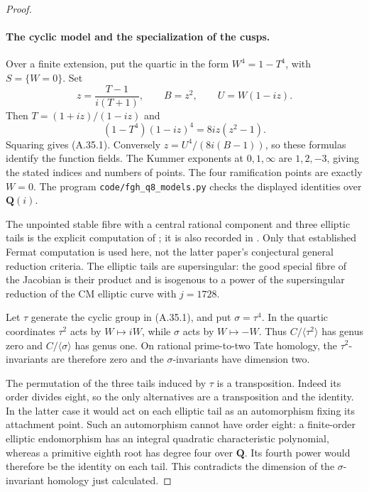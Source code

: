 \begin{proof}
\paragraph{The cyclic model and the specialization of the cusps.}
Over a finite extension, put the quartic in the form
\(W^4=1-T^4\), with \(S=\{W=0\}\). Set
\[
 z=\frac{T-1}{i(T+1)},\qquad B=z^2,\qquad
 U=W(1-iz).
\]
Then \(T=(1+iz)/(1-iz)\) and
\[
 (1-T^4)(1-iz)^4=8iz(z^2-1).
\]
Squaring gives (A.35.1). Conversely \(z=U^4/(8i(B-1))\),
so these formulas identify the function fields. The Kummer
exponents at \(0,1,\infty\) are \(1,2,-3\), giving the stated
indices and numbers of points. The four ramification points are
exactly \(W=0\). The program
\texttt{code/fgh\_q8\_models.py} checks the displayed identities
over \(\mathbf Q(i)\).

The unpointed stable fibre with a central rational component
and three elliptic tails is the explicit computation of
\cite[Example 10.4.39, pp.\ 548--549]{fghLiu};
it is also recorded in
\cite[Table 7.1, p.\ 50]{fghQuarticReduction}.
Only that established Fermat computation is used here, not
the latter paper's conjectural general reduction criteria.
The elliptic tails are supersingular: the good special fibre
of the Jacobian is their product and is isogenous to a power
of the supersingular reduction of the CM elliptic curve
with \(j=1728\).

Let \(\tau\) generate the cyclic group in (A.35.1), and put
\(\sigma=\tau^4\). In the quartic coordinates
\(\tau^2\) acts by \(W\mapsto iW\), while
\(\sigma\) acts by \(W\mapsto-W\).
Thus \(C/\langle\tau^2\rangle\) has genus zero and
\(C/\langle\sigma\rangle\) has genus one. On rational
prime-to-two Tate homology, the \(\tau^2\)-invariants are
therefore zero and the \(\sigma\)-invariants have dimension two.

The permutation of the three tails induced by \(\tau\) is a
transposition. Indeed its order divides eight, so the only
alternatives are a transposition and the identity. In the latter
case it would act on each elliptic tail as an automorphism
fixing its attachment point. Such an automorphism cannot have
order eight: a finite-order elliptic endomorphism has an
integral quadratic characteristic polynomial, whereas a
primitive eighth root has degree four over \(\mathbf Q\).
Its fourth power would therefore be the identity on each
tail. This contradicts the dimension of the
\(\sigma\)-invariant homology just calculated.


\end{proof}

